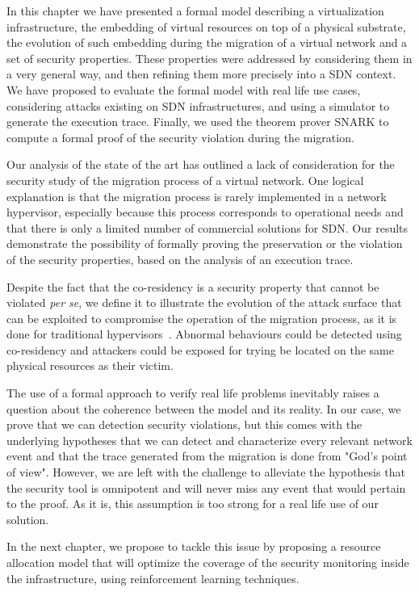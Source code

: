 In this chapter we have presented a formal model describing a virtualization infrastructure, the embedding of virtual resources on top of a physical substrate, the evolution of such embedding during the migration of a virtual network and a set of security properties. These properties were addressed by considering them in a very general way, and then refining them more precisely into a SDN context. We have proposed to evaluate the formal model with real life use cases, considering attacks existing on SDN infrastructures, and using a simulator to generate the execution trace. Finally, we used the theorem prover SNARK to compute a formal proof of the security violation during the migration.

Our analysis of the state of the art has outlined a lack of consideration for the security study of the migration process of a virtual network.
One logical explanation is that the migration process is rarely implemented in a network hypervisor, especially because this process corresponds to operational needs and that there is only a limited number of commercial solutions for SDN.
Our results demonstrate the possibility of formally proving the preservation or the violation of the security properties, based on the analysis of an execution trace.

Despite the fact that the co-residency is a security property that cannot be violated \textit{per se}, we define it to illustrate the evolution of the attack surface that can be exploited to compromise the operation of the migration process, as it is done for traditional hypervisors~\cite{stalling-atya2017,malicious-atya2017}.
Abnormal behaviours could be detected using co-residency and attackers could be exposed for trying be located on the same physical resources as their victim. 

The use of a formal approach to verify real life problems inevitably raises a question about the coherence between the model and its reality.
In our case, we prove that we can detection security violations, but this comes with the underlying hypotheses that we can detect and characterize every relevant network event and that the trace generated from the migration is done from "God's point of view". However, we are left with the challenge to alleviate the hypothesis that the security tool is omnipotent and will never miss any event that would pertain to the proof. As it is, this assumption is too strong for a real life use of our solution.

In the next chapter, we propose to tackle this issue by proposing a resource allocation model that will optimize the coverage of the security monitoring inside the infrastructure, using reinforcement learning techniques.